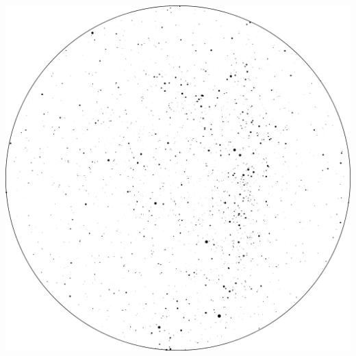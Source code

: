 \documentclass{SAS-class-skygen}
\begin{document}
	\vspace{0.5cm}
    \begin{center}
    \includegraphics[width=\textwidth]{./pics/sky_chart16.png}
    \end{center}
    
    
\end{document}
